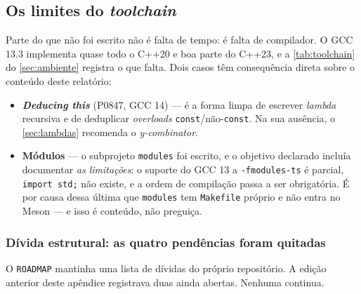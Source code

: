 \subsection{Os limites do \emph{toolchain}}
\label{sec:limites}

Parte do que não foi escrito não é falta de tempo: é falta de compilador. O
GCC 13.3 implementa quase todo o C++20 e boa parte do C++23, e a
\cref{tab:toolchain} do \cref{sec:ambiente} registra o que falta. Dois casos têm
consequência direta sobre o conteúdo deste relatório:

\begin{itemize}
    \item \textbf{\emph{Deducing this}} (P0847, GCC 14) --- é a forma limpa de
          escrever \emph{lambda} recursiva e de deduplicar \emph{overloads}
          \texttt{const}/não-\texttt{const}. Na sua ausência, o
          \cref{sec:lambdas} recomenda o \emph{y-combinator}.
    \item \textbf{Módulos} --- o subprojeto \texttt{modules} foi escrito, e o
          objetivo declarado incluía documentar \emph{as limitações}: o suporte
          do GCC 13 a \texttt{-fmodules-ts} é parcial, \texttt{import std;} não
          existe, e a ordem de compilação passa a ser obrigatória. É por causa
          dessa última que \texttt{modules} tem \texttt{Makefile} próprio e não
          entra no Meson --- e isso é conteúdo, não preguiça.
\end{itemize}

\subsubsection{Dívida estrutural: as quatro pendências foram quitadas}

O \texttt{ROADMAP} mantinha uma lista de dívidas do próprio repositório. A
edição anterior deste apêndice registrava duas ainda abertas. Nenhuma continua.

